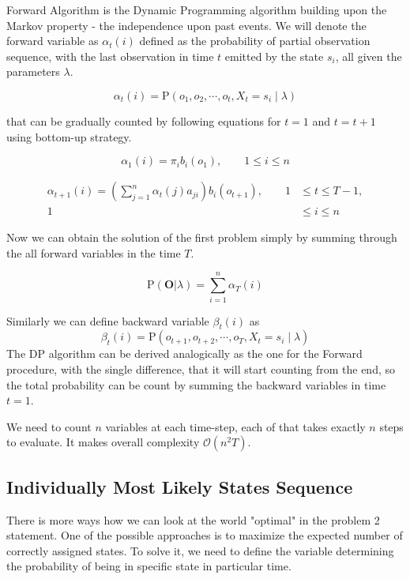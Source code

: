 \documentclass[thesis=M,english]{FITthesis}[2012/10/20]
\newcommand{\matr}[1]{\mathbf{#1}}
\begin{document}
Forward Algorithm is the Dynamic Programming algorithm building upon the Markov property - the independence upon past events. We will denote the forward variable as $\alpha_t(i)$ defined as the probability of partial observation sequence, with the last observation in time $t$ emitted by the state $s_i$, all given the parameters $\lambda$.

\begin{equation}
\alpha_t(i) = \mathrm{P}(o_1,o_2,\cdots,o_t,X_t = s_i \mid \lambda )
\end{equation}

that can be gradually counted by following equations for $t=1$ and $t=t+1$ using bottom-up strategy.

\begin{equation}
\alpha_1(i) = \pi_i b_i(o_1), \qquad 1 \leq i \leq n
\end{equation}

\begin{equation}
\begin{aligned}
\alpha_{t+1}(i) = \left( \sum_{j=1}^n \alpha_t(j) a_{ji} \right) b_i(o_{t+1}), \qquad 1& \leq t \leq T - 1, \\ 
                                                                                 1& \leq i \leq n		\end{aligned}
\end{equation}

Now we can obtain the solution of the first problem simply by summing through the all forward variables in the time $T$.

\begin{equation}
\mathrm{P}(\matr{O}|\lambda) = \sum_{i=1}^n \alpha_T(i)
\end{equation} 

Similarly we can define backward variable $\beta_t(i)$ as
\begin{equation}
\beta_t(i) = \mathrm{P}(o_{t+1},o_{t+2},\cdots,o_T,X_t = s_i \mid \lambda ) 
\end{equation}
The DP algorithm can be derived analogically as the one for the Forward procedure, with the single difference, that it will start counting from the end, so the total probability can be count by summing the backward variables in time $t=1$.

We need to count $n$ variables at each time-step, each of that takes exactly $n$ steps to evaluate. It makes overall complexity $\mathcal{O}(n^2T)$.    

\subsection{Individually Most Likely States Sequence}\label{sec:ssp}
There is more ways how we can look at the world "optimal" in the problem 2 statement. One of the possible approaches is to maximize the expected number of correctly assigned states. To solve it, we need to define the variable determining the probability of being in specific state in particular time.
\end{document}
